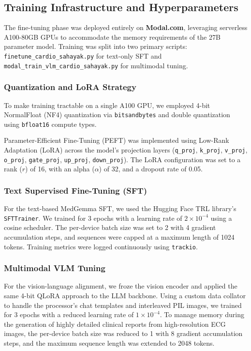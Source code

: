 \documentclass[11pt,a4paper]{article}
\begin{document}
\subsection{Training Infrastructure and Hyperparameters}
The fine-tuning phase was deployed entirely on \textbf{Modal.com}, leveraging serverless A100-80GB GPUs to accommodate the memory requirements of the 27B parameter model. Training was split into two primary scripts: \texttt{finetune\_cardio\_sahayak.py} for text-only SFT and \texttt{modal\_train\_vlm\_cardio\_sahayak.py} for multimodal tuning.

\subsubsection{Quantization and LoRA Strategy}
To make training tractable on a single A100 GPU, we employed 4-bit NormalFloat (NF4) quantization via \texttt{bitsandbytes} and double quantization using \texttt{bfloat16} compute types. 

Parameter-Efficient Fine-Tuning (PEFT) was implemented using Low-Rank Adaptation (LoRA) across the model's projection layers (\texttt{q\_proj}, \texttt{k\_proj}, \texttt{v\_proj}, \texttt{o\_proj}, \texttt{gate\_proj}, \texttt{up\_proj}, \texttt{down\_proj}). The LoRA configuration was set to a rank ($r$) of 16, with an alpha ($\alpha$) of 32, and a dropout rate of 0.05.

\subsubsection{Text Supervised Fine-Tuning (SFT)}
For the text-based MedGemma SFT, we used the Hugging Face TRL library's \texttt{SFTTrainer}. We trained for 3 epochs with a learning rate of $2\times 10^{-4}$ using a cosine scheduler. The per-device batch size was set to 2 with 4 gradient accumulation steps, and sequences were capped at a maximum length of 1024 tokens. Training metrics were logged continuously using \texttt{trackio}.

\subsubsection{Multimodal VLM Tuning}
For the vision-language alignment, we froze the vision encoder and applied the same 4-bit QLoRA approach to the LLM backbone. Using a custom data collator to handle the processor's chat templates and interleaved PIL images, we trained for 3 epochs with a reduced learning rate of $1\times 10^{-4}$. To manage memory during the generation of highly detailed clinical reports from high-resolution ECG images, the per-device batch size was reduced to 1 with 8 gradient accumulation steps, and the maximum sequence length was extended to 2048 tokens. 
\end{document}
